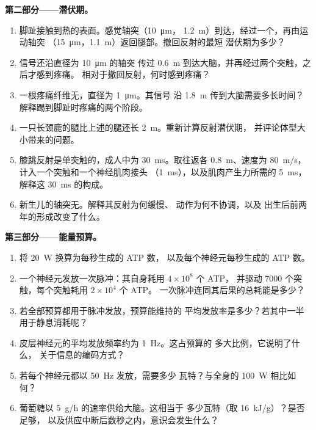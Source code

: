 \begin{problem}
\medskip
\noindent\textbf{第二部分——潜伏期。}
\begin{enumerate}[resume]
  \item 脚趾接触到热的表面。感觉轴突（\qty{10}{\micro m}，
        \qty{1.2}{m}）到达，经过一个，再由运动轴突
        （\qty{15}{\micro m}，\qty{1.1}{m}）返回腿部。撤回反射的最短
        潜伏期为多少？
  \item 信号还沿直径为 \qty{10}{\micro m} 的轴突
        传过 \qty{0.6}{m} 到达大脑，并再经过两个突触，之后才感到疼痛。
        相对于撤回反射，何时感到疼痛？
  \item 一根疼痛纤维无，直径为 \qty{1}{\micro m}。其信号
        沿 \qty{1.8}{m} 传到大脑需要多长时间？
        解释踢到脚趾时疼痛的两个阶段。
  \item 一只长颈鹿的腿比上述的腿还长 \qty{2}{m}。重新计算反射潜伏期，
        并评论体型大小带来的问题。
  \item 膝跳反射是单突触的，成人中为 \qty{30}{ms}。取往返各
        \qty{0.8}{m}、速度为 \qty{80}{m/s}，计入一个突触和一个神经肌肉接头
        （\qty{1}{ms}），以及肌肉产生力所需的 \qty{5}{ms}，
        解释这 \qty{30}{ms} 的构成。
  \item 新生儿的轴突无。解释其反射为何缓慢、
        动作为何不协调，以及
        出生后前两年的形成改变了什么。
\end{enumerate}

\medskip
\noindent\textbf{第三部分——能量预算。}
\begin{enumerate}[resume]
  \item 将 \qty{20}{W} 换算为每秒生成的 ATP 数，
        以及每个神经元每秒生成的 ATP 数。
  \item 一个神经元发放一次脉冲：其自身耗用 $4\times 10^{8}$ 个 ATP，
        并驱动 \num{7000} 个突触，每个突触耗用 $2\times 10^{4}$ 个 ATP。
        一次脉冲连同其后果的总耗能是多少？
  \item 若全部预算都用于脉冲发放，预算能维持的
        平均发放率是多少？若其中一半用于静息消耗呢？
  \item 皮层神经元的平均发放频率约为 \qty{1}{Hz}。这占预算的
        多大比例，它说明了什么，
        关于信息的编码方式？
  \item 若每个神经元都以 \qty{50}{Hz} 发放，需要多少
        瓦特？与全身的 \qty{100}{W} 相比如何？
  \item 葡萄糖以 \qty{5}{g/h} 的速率供给大脑。这相当于
        多少瓦特（取 \qty{16}{kJ/g}）？是否足够，
        以及供应中断后数秒之内，意识会发生什么？
\end{enumerate}


\end{problem}
